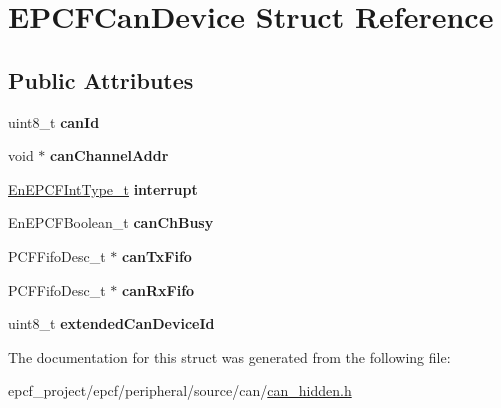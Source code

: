 \hypertarget{structEPCFCanDevice}{}\section{E\+P\+C\+F\+Can\+Device Struct Reference}
\label{structEPCFCanDevice}
\subsection*{Public Attributes}
\begin{DoxyCompactItemize}
\item 
\mbox{\label{structEPCFCanDevice_aba874da02092b80d3ce10a25f91a58bb}} 
uint8\+\_\+t {\bfseries can\+Id}
\item 
\mbox{\label{structEPCFCanDevice_a75c8c84980843ed624779e034d23d30e}} 
void $\ast$ {\bfseries can\+Channel\+Addr}
\item 
\mbox{\label{structEPCFCanDevice_a8ec7fd616de794158b14444c43811ad5}} 
\mbox{\hyperlink{can_8h_a62829201a68b21def737cc94b7e20803}{En\+E\+P\+C\+F\+Int\+Type\+\_\+t}} {\bfseries interrupt}
\item 
\mbox{\label{structEPCFCanDevice_ab0e625a5c215ce6e572b1f4a44f89828}} 
En\+E\+P\+C\+F\+Boolean\+\_\+t {\bfseries can\+Ch\+Busy}
\item 
\mbox{\label{structEPCFCanDevice_a208e0c034084740ecc12ba75ef89a055}} 
P\+C\+F\+Fifo\+Desc\+\_\+t $\ast$ {\bfseries can\+Tx\+Fifo}
\item 
\mbox{\label{structEPCFCanDevice_a4b07e78ec517a4fa36ab510af33cd412}} 
P\+C\+F\+Fifo\+Desc\+\_\+t $\ast$ {\bfseries can\+Rx\+Fifo}
\item 
\mbox{\label{structEPCFCanDevice_a5f553bf3ea5d23be633678899b81ee7c}} 
uint8\+\_\+t {\bfseries extended\+Can\+Device\+Id}
\end{DoxyCompactItemize}


The documentation for this struct was generated from the following file\+:\begin{DoxyCompactItemize}
\item 
epcf\+\_\+project/epcf/peripheral/source/can/\mbox{\hyperlink{can__hidden_8h}{can\+\_\+hidden.\+h}}\end{DoxyCompactItemize}
